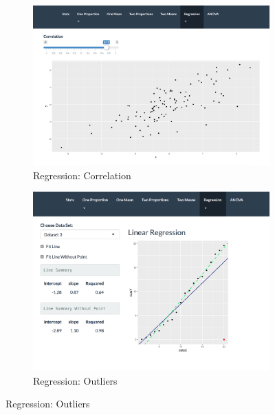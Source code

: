 \documentclass[11pt]{book}
\begin{document}
\begin{figure}
        \centering
         \begin{subfigure}[b]{0.6\textwidth}
                \includegraphics[width=\textwidth]{Correlation.png}
                \caption{Regression: Correlation} 
                \label{fig:Correlation}
        \end{subfigure}
        
        \begin{subfigure}[b]{0.6\textwidth}
                \includegraphics[width=\textwidth]{Outliers.png}
                \caption{Regression: Outliers }
                \label{fig:Outliers}
        \end{subfigure}%


\end{figure}
\end{document}
